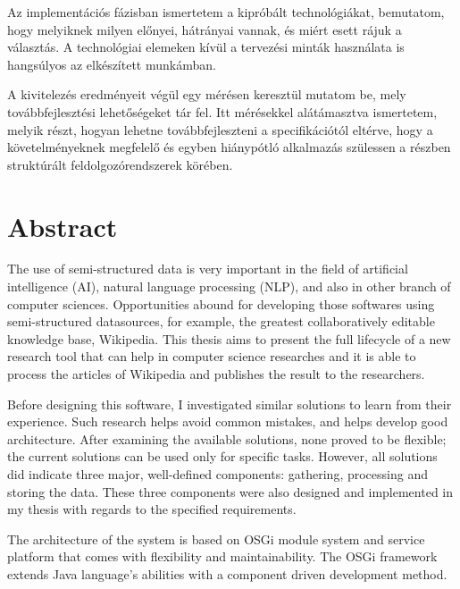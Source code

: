 Az implementációs fázisban ismertetem a kipróbált technológiákat, bemutatom, hogy melyiknek milyen előnyei, hátrányai vannak, és miért esett rájuk a választás. A technológiai elemeken kívül a tervezési minták használata is hangsúlyos az elkészített munkámban.

A kivitelezés eredményeit végül egy mérésen keresztül mutatom be, mely továbbfejlesztési lehetőségeket tár fel. Itt mérésekkel alátámasztva ismertetem, melyik részt, hogyan lehetne továbbfejleszteni a specifikációtól eltérve, hogy a követelményeknek megfelelő és egyben hiánypótló alkalmazás szülessen a részben struktúrált feldolgozórendszerek körében.

\vfill

\chapter*{Abstract}

The use of semi-structured data is very important in the field of artificial intelligence (AI), natural language processing (NLP), and also in other branch of computer sciences. Opportunities abound for developing those softwares using semi-structured datasources, for example, the greatest collaboratively editable knowledge base, Wikipedia. This thesis aims to present the full lifecycle of a new research tool that can help in computer science researches and it is able to process the articles of Wikipedia and publishes the result to the researchers.

Before designing this software, I investigated similar solutions to learn from their experience. Such research helps avoid common mistakes, and helps develop good architecture. After examining the available solutions, none proved to be flexible; the current solutions can be used only for specific tasks. However, all solutions did indicate three major, well-defined components: gathering, processing and storing the data. These three components were also designed and implemented in my thesis with regards to the specified requirements.

The architecture of the system is based on OSGi module system and service platform that comes with flexibility and maintainability. The OSGi framework extends Java language's abilities with a component driven development method.

